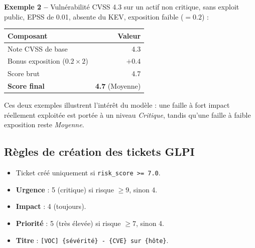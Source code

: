 \textbf{Exemple 2 --} Vuln\'erabilit\'e CVSS 4.3 sur un actif non critique,
sans exploit public, EPSS de 0.01, absente du KEV, exposition faible
($= 0.2$) :

\begin{center}
\small
\begin{tabular}{l r}
\toprule
\textbf{Composant} & \textbf{Valeur} \\
\midrule
Note CVSS de base & 4.3 \\
Bonus exposition ($0.2 \times 2$) & $+0.4$ \\
\midrule
Score brut & 4.7 \\
\textbf{Score final} & \textbf{4.7} (Moyenne) \\
\bottomrule
\end{tabular}
\end{center}

Ces deux exemples illustrent l'int\'er\^et du mod\`ele : une faille \`a fort
impact r\'eellement exploit\'ee est port\'ee \`a un niveau \emph{Critique},
tandis qu'une faille \`a faible exposition reste \emph{Moyenne}.

\subsection{R\`egles de cr\'eation des tickets GLPI}

\begin{itemize}[leftmargin=1.6em]
  \item Ticket cr\'e\'e uniquement si \texttt{risk\_score >= 7.0}.
  \item \textbf{Urgence} : 5 (critique) si risque $\geq 9$, sinon 4.
  \item \textbf{Impact} : 4 (toujours).
  \item \textbf{Priorit\'e} : 5 (tr\`es \'elev\'ee) si risque $\geq 7$, sinon 4.
  \item \textbf{Titre} : \texttt{[VOC] \{s\'ev\'erit\'e\} - \{CVE\} sur \{h\^ote\}}.
\end{itemize}

\clearpage
